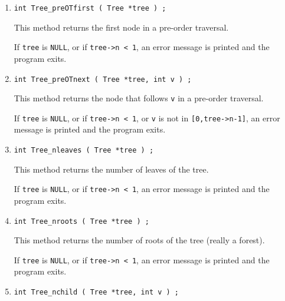 \begin{enumerate}
\item
\begin{verbatim}
int Tree_preOTfirst ( Tree *tree ) ;
\end{verbatim}
This method returns the first node in a pre-order traversal.
\par {}
If {\tt tree} is {\tt NULL}, 
or if {\tt tree->n < 1}, 
an error message is printed and the program exits.
\item
\begin{verbatim}
int Tree_preOTnext ( Tree *tree, int v ) ;
\end{verbatim}
This method returns the node that follows {\tt v}
in a pre-order traversal.
\par {}
If {\tt tree} is {\tt NULL}, 
or if {\tt tree->n < 1},
or {\tt v} is not in {\tt [0,tree->n-1]},
an error message is printed and the program exits.
\item
\begin{verbatim}
int Tree_nleaves ( Tree *tree ) ;
\end{verbatim}
This method returns the number of leaves of the tree.
\par {}
If {\tt tree} is {\tt NULL}, 
or if {\tt tree->n < 1},
an error message is printed and the program exits.
\item
\begin{verbatim}
int Tree_nroots ( Tree *tree ) ;
\end{verbatim}
This method returns the number of roots of the tree (really a forest).
\par {}
If {\tt tree} is {\tt NULL}, 
or if {\tt tree->n < 1},
an error message is printed and the program exits.
\item
\begin{verbatim}
int Tree_nchild ( Tree *tree, int v ) ;
\end{verbatim}

\end{enumerate}
